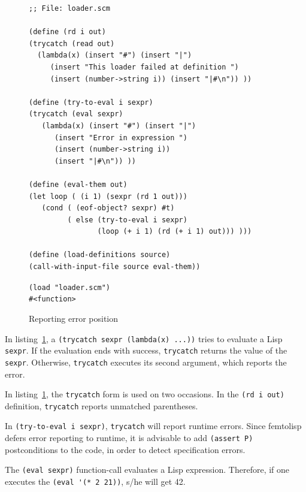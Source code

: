 \documentclass[a4paper,12pt]{book}
\newenvironment{fmpage}[1]
           {\begin{lrbox}{\fmbox}\begin{minipage}{#1}}
           {\end{minipage}\end{lrbox}\fbox{\usebox{\fmbox}}}
\begin{document}
\begin{figure}[!h]
\begin{fmpage}{0.9\textwidth}
\begin{verbatim}
;; File: loader.scm

(define (rd i out)
(trycatch (read out) 
  (lambda(x) (insert "#") (insert "|")
     (insert "This loader failed at definition ")
     (insert (number->string i)) (insert "|#\n")) ))

(define (try-to-eval i sexpr)
(trycatch (eval sexpr)
   (lambda(x) (insert "#") (insert "|")
      (insert "Error in expression ")
      (insert (number->string i))
      (insert "|#\n")) ))

(define (eval-them out)
(let loop ( (i 1) (sexpr (rd 1 out)))
   (cond ( (eof-object? sexpr) #t)
         ( else (try-to-eval i sexpr)
                (loop (+ i 1) (rd (+ i 1) out))) )))

(define (load-definitions source)
(call-with-input-file source eval-them))
\end{verbatim}
\end{fmpage}

\begin{fmpage}{0.9\textwidth}
\verb|(load "loader.scm")|\\
\verb|#<function>|\\
\end{fmpage}
\caption{Reporting error position}
\label{error-position}
\end{figure}

In listing~\ref{error-position},
a \verb|(trycatch sexpr (lambda(x) ...))|
tries to evaluate a Lisp \verb|sexpr|.
If the evaluation
ends with success, \verb|trycatch|
returns the value of the \verb|sexpr|.
Otherwise,
\verb|trycatch| executes its second
argument, which reports the error.

In listing~\ref{error-position},
the \verb|trycatch| form is used on
two occasions. In the \verb|(rd i out)|
definition, \verb|trycatch| reports
unmatched parentheses.

In \verb|(try-to-eval i sexpr)|,
\verb|trycatch| will report runtime
errors. Since femtolisp defers
error reporting to runtime, it is
advisable to add \verb|(assert P)|
postconditions to the code, in
order to detect specification
errors.

The \verb|(eval sexpr)| function-call
evaluates a Lisp expression. Therefore,
if one executes the \verb|(eval '(* 2 21))|,
s/he  will get 42.
\end{document}
